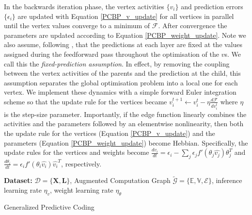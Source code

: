 In the backwards iteration phase, the vertex activities $\{ v_i \}$ and prediction errors $\{\epsilon_i \}$ are updated with Equation \ref{PCBP_v_update} for all vertices in parallel until the vertex values converge to a minimum of $\mathcal{F}$. After convergence the parameters are updated according to Equation \ref{PCBP_weight_update}. Note we also assume, following \citet{whittington2017approximation}, that the predictions at each layer are fixed at the values assigned during the feedforward pass throughout the optimisation of the $v$s. We call this the \emph{fixed-prediction assumption}. In effect, by removing the coupling between the vertex activities of the parents and the prediction at the child, this assumption separates the global optimisation problem into a local one for each vertex. We implement these dynamics with a simple forward Euler integration scheme so that the update rule for the vertices became $v_i^{t+1} \leftarrow v_i^t - \eta \frac{d\mathcal{F}}{dv_i^t}$
where $\eta$ is the step-size parameter. Importantly, if the edge function linearly combines the activities and the parameters followed by an elementwise nonlinearity, then both the update rule for the vertices (Equation \ref{PCBP_v_update}) and the parameters (Equation \ref{PCBP_weight_update}) become Hebbian. Specifically, the update rules for the vertices and weights become $\frac{dv_i}{dt} = \epsilon_i - \sum_j \epsilon_j f'(\theta_j \hat{v_j}) \theta_j^T$ and $\frac{d\theta_i}{dt} = \epsilon_i f'(\theta_i \hat{v_i}) \hat{v_i}^T$, respectively.

\begin{algorithm}[H]
\SetAlgoLined
\DontPrintSemicolon
\textbf{Dataset:} $\mathcal{D} = \{\mathbf{X},\mathbf{L}\}$, Augmented Computation Graph $\tilde{\mathcal{G}} = \{\mathbb{E},\mathbb{V},\mathcal{E}\}$, inference learning rate $\eta_v$, weight learning rate $\eta_\theta$
\BlankLine

\caption{Generalized Predictive Coding \label{general_alg_pseudocode}}
\end{algorithm}

